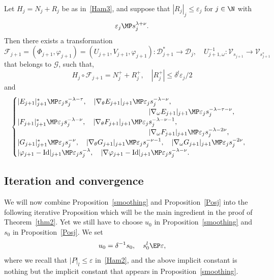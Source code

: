 \begin{proposition}\label{Posj}
Let $H_j=N_j+R_j$ be as in~\eqref{Ham3}, and suppose that $|R_j|_{j} \leq \varepsilon_j$ for $j \in \N$ with
\begin{equation}\label{seuilj}
\varepsilon_j \MP s_j^{\lambda+\nu}.
\end{equation}
Then there exists a transformation
\[ \mathcal{F}_{j+1}=(\Phi_{j+1},\varphi_{j+1})=(U_{j+1},V_{j+1},\varphi_{j+1}) : \mathcal{D}_{j+1}^* \to \mathcal{D}_j, \quad U_{j+1,\omega}^{-1}: \mathcal{V}_{s_{j+1}} \to \mathcal{V}_{s_{j+1}^*}\]
that belongs to $\mathcal{G}$, such that,
\begin{equation}\label{estim1j}
H_j \circ \mathcal{F}_{j+1}=N_j^++R_j^+, \quad |R_j^+| \leq \delta^l\varepsilon_j/2
\end{equation}
and
\begin{equation}\label{estim2j}
\begin{cases}
|E_{j+1}|_{j+1}^* \MP \varepsilon_js_j^{-\lambda-\tau}, \quad |\nabla_\theta E_{j+1}|_{j+1} \MP \varepsilon_js_j^{-\lambda-\nu}, \\
\hspace*{6.5cm} |\nabla_\omega E_{j+1}|_{j+1} \MP \varepsilon_js_j^{-\lambda-\tau-\nu},\\
|F_{j+1}|_{j+1}^* \MP \varepsilon_js_j^{-\lambda-\nu}, \quad |\nabla_\theta F_{j+1}|_{j+1} \MP \varepsilon_js_j^{-\lambda-\nu-1}, \\
\hspace*{6.5cm} |\nabla_\omega F_{j+1}|_{j+1} \MP \varepsilon_js_j^{-\lambda-2\nu}, \\
|G_{j+1}|_{j+1}^* \MP \varepsilon_js_j^{-\nu}, \quad |\nabla_\theta G_{j+1}|_{j+1} \MP \varepsilon_js_j^{-\nu-1}, \quad |\nabla_\omega G_{j+1}|_{j+1} \MP \varepsilon_js_j^{-2\nu}, \\
|\varphi_{j+1}-\mathrm{Id}|_{j+1} \MP \varepsilon_j s_j^{-\lambda}, \quad |\nabla \varphi_{j+1}-\mathrm{Id}|_{j+1} \MP \varepsilon_j s_j^{-\lambda-\nu}.
\end{cases}
\end{equation}
\end{proposition}

\subsection{Iteration and convergence}

We will now combine Proposition~\ref{smoothing} and Proposition~\ref{Posj} into the following iterative Proposition which will be the main ingredient in the proof of Theorem~\ref{thm2}. Yet we still have to choose $u_0$ in Proposition~\ref{smoothing} and $s_0$ in Proposition~\ref{Posj}. We set
\begin{equation}\label{s0}
u_0=\delta^{-1} s_0, \quad s_0^l \EP \varepsilon,
\end{equation}
where we recall that $|P|_l \leq \varepsilon$ in~\eqref{Ham2}, and the above implicit constant is nothing but the implicit constant that appears in Proposition~\ref{smoothing}.

